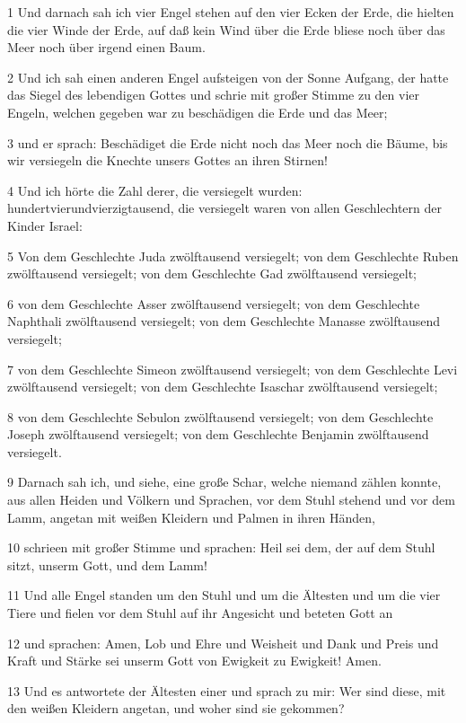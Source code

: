 \par 1 Und darnach sah ich vier Engel stehen auf den vier Ecken der Erde, die hielten die vier Winde der Erde, auf daß kein Wind über die Erde bliese noch über das Meer noch über irgend einen Baum.
\par 2 Und ich sah einen anderen Engel aufsteigen von der Sonne Aufgang, der hatte das Siegel des lebendigen Gottes und schrie mit großer Stimme zu den vier Engeln, welchen gegeben war zu beschädigen die Erde und das Meer;
\par 3 und er sprach: Beschädiget die Erde nicht noch das Meer noch die Bäume, bis wir versiegeln die Knechte unsers Gottes an ihren Stirnen!
\par 4 Und ich hörte die Zahl derer, die versiegelt wurden: hundertvierundvierzigtausend, die versiegelt waren von allen Geschlechtern der Kinder Israel:
\par 5 Von dem Geschlechte Juda zwölftausend versiegelt; von dem Geschlechte Ruben zwölftausend versiegelt; von dem Geschlechte Gad zwölftausend versiegelt;
\par 6 von dem Geschlechte Asser zwölftausend versiegelt; von dem Geschlechte Naphthali zwölftausend versiegelt; von dem Geschlechte Manasse zwölftausend versiegelt;
\par 7 von dem Geschlechte Simeon zwölftausend versiegelt; von dem Geschlechte Levi zwölftausend versiegelt; von dem Geschlechte Isaschar zwölftausend versiegelt;
\par 8 von dem Geschlechte Sebulon zwölftausend versiegelt; von dem Geschlechte Joseph zwölftausend versiegelt; von dem Geschlechte Benjamin zwölftausend versiegelt.
\par 9 Darnach sah ich, und siehe, eine große Schar, welche niemand zählen konnte, aus allen Heiden und Völkern und Sprachen, vor dem Stuhl stehend und vor dem Lamm, angetan mit weißen Kleidern und Palmen in ihren Händen,
\par 10 schrieen mit großer Stimme und sprachen: Heil sei dem, der auf dem Stuhl sitzt, unserm Gott, und dem Lamm!
\par 11 Und alle Engel standen um den Stuhl und um die Ältesten und um die vier Tiere und fielen vor dem Stuhl auf ihr Angesicht und beteten Gott an
\par 12 und sprachen: Amen, Lob und Ehre und Weisheit und Dank und Preis und Kraft und Stärke sei unserm Gott von Ewigkeit zu Ewigkeit! Amen.
\par 13 Und es antwortete der Ältesten einer und sprach zu mir: Wer sind diese, mit den weißen Kleidern angetan, und woher sind sie gekommen?
